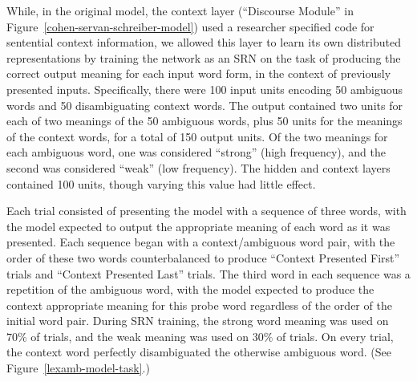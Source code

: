 While, in the original model, the context layer (``Discourse Module'' in Figure~\ref{cohen-servan-schreiber-model}) used a researcher specified code for sentential context information, we allowed this layer to learn its own distributed representations by training the network as an SRN on the task of producing the correct output meaning for each input word form, in the context of previously presented inputs. Specifically, there were 100 input units encoding 50 ambiguous words and 50 disambiguating context words. The output contained two units for each of two meanings of the 50 ambiguous words, plus 50 units for the meanings of the context words, for a total of 150 output units. Of the two meanings for each ambiguous word, one was considered ``strong'' (high frequency), and the second was considered ``weak'' (low frequency). The hidden and context layers contained 100 units, though varying this value had little effect.

Each trial consisted of presenting the model with a sequence of three words, with the model expected to output the appropriate meaning of each word as it was presented. Each sequence began with a context/ambiguous word pair, with the order of these two words counterbalanced to produce ``Context Presented First'' trials and ``Context Presented Last'' trials. The third word in each sequence was a repetition of the ambiguous word, with the model expected to produce the context appropriate meaning for this probe word regardless of the order of the initial word pair. During SRN training, the strong word meaning was used on $70\%$ of trials, and the weak meaning was used on $30\%$ of trials. On every trial, the context word perfectly disambiguated the otherwise ambiguous word. (See Figure~\ref{lexamb-model-task}.) 


